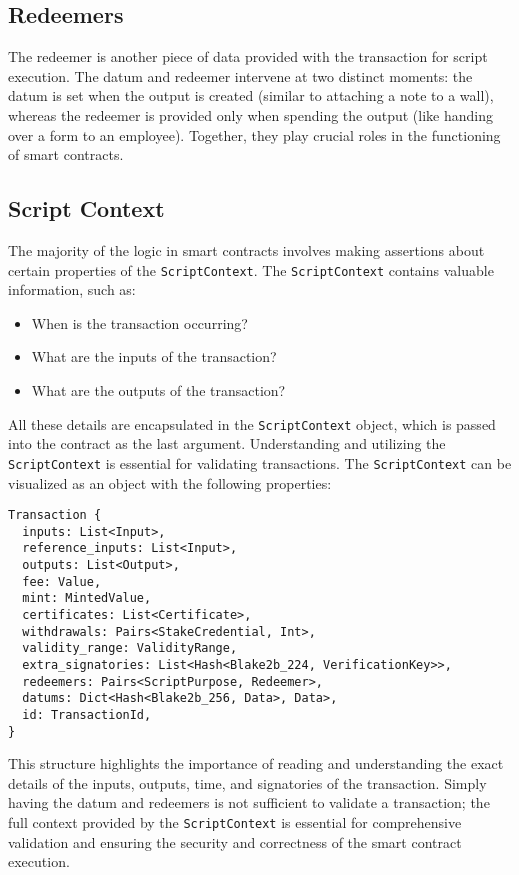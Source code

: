 \subsection{Redeemers}
The redeemer is another piece of data provided with the transaction for script execution. The datum and redeemer intervene at two distinct moments: the datum is set when the output is created (similar to attaching a note to a wall), whereas the redeemer is provided only when spending the output (like handing over a form to an employee). Together, they play crucial roles in the functioning of smart contracts.

\subsection{Script Context}
The majority of the logic in smart contracts involves making assertions about certain properties of the \texttt{ScriptContext}. The \texttt{ScriptContext} contains valuable information, such as:

\begin{itemize}
    \item When is the transaction occurring?
    \item What are the inputs of the transaction?
    \item What are the outputs of the transaction?
\end{itemize}

All these details are encapsulated in the \texttt{ScriptContext} object, which is passed into the contract as the last argument. Understanding and utilizing the \texttt{ScriptContext} is essential for validating transactions. The \texttt{ScriptContext} can be visualized as an object with the following properties:

\begin{lstlisting}
Transaction {
  inputs: List<Input>,
  reference_inputs: List<Input>,
  outputs: List<Output>,
  fee: Value,
  mint: MintedValue,
  certificates: List<Certificate>,
  withdrawals: Pairs<StakeCredential, Int>,
  validity_range: ValidityRange,
  extra_signatories: List<Hash<Blake2b_224, VerificationKey>>,
  redeemers: Pairs<ScriptPurpose, Redeemer>,
  datums: Dict<Hash<Blake2b_256, Data>, Data>,
  id: TransactionId,
}
\end{lstlisting}

This structure highlights the importance of reading and understanding the exact details of the inputs, outputs, time, and signatories of the transaction. Simply having the datum and redeemers is not sufficient to validate a transaction; the full context provided by the \texttt{ScriptContext} is essential for comprehensive validation and ensuring the security and correctness of the smart contract execution.

